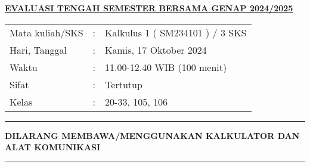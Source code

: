 \documentclass[10pt,openany,a4paper]{article}
\renewcommand{\headrulewidth}{0pt}
\renewcommand{\footrulewidth}{0pt}
\begin{document}
\newpage
\renewcommand{\arraystretch}{1}
\fancyhead{}
\fancyfoot{}
\fancyhead[r]{}
\renewcommand{\headrulewidth}{0pt}
\renewcommand{\footrulewidth}{0pt}
\begin{center}
    {\underline{\textbf{\MakeUppercase{Evaluasi Tengah Semester Bersama Genap 2024/2025}}}}
\end{center}

\begin{center}
    \begin{tabular}{lcl}
        Mata kuliah/SKS & : & Kalkulus 1 ( SM234101 ) / 3 SKS \\
        Hari, Tanggal   & : & Kamis, 17 Oktober 2024          \\
        Waktu           & : & 11.00-12.40 WIB (100 menit)     \\
        Sifat           & : & Tertutup                        \\
        Kelas           & : & 20-33, 105, 106
    \end{tabular}
\end{center}

\noindent\rule{\textwidth}{2.pt}

\setlength{\parindent}{5pt}
\setlength{\parindent}{5pt}
\setlength{\parindent}{5pt}
\par \textbf{\MakeUppercase{dilarang membawa/menggunakan kalkulator dan alat komunikasi}}
\par {}
\noindent\rule{\textwidth}{2.pt}
\end{document}
